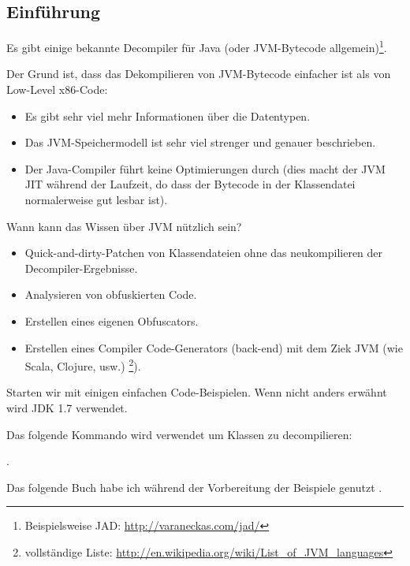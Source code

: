 \subsection{Einführung}

\newcommand{\JADURL}{\url{http://varaneckas.com/jad/}}

Es gibt einige bekannte Decompiler für Java (oder \ac{JVM}-Bytecode
allgemein)\footnote{Beispielsweise JAD: \JADURL}.

Der Grund ist, dass das Dekompilieren von \ac{JVM}-Bytecode einfacher ist als
von Low-Level x86-Code:

\begin{itemize}
\item Es gibt sehr viel mehr Informationen über die Datentypen.
\item Das \ac{JVM}-Speichermodell ist sehr viel strenger und genauer beschrieben.
\item Der Java-Compiler führt keine Optimierungen durch (dies macht der \ac{JVM}
\ac{JIT} während der Laufzeit, do dass der Bytecode in der Klassendatei normalerweise
gut lesbar ist).
\end{itemize}

Wann kann das Wissen über \ac{JVM} nützlich sein?

\newcommand{\URLListOfJVMLangs}{\url{http://en.wikipedia.org/wiki/List_of_JVM_languages}}

\begin{itemize}
\item Quick-and-dirty-Patchen von Klassendateien ohne das neukompilieren der Decompiler-Ergebnisse.
\item Analysieren von obfuskierten Code.
\item Erstellen eines eigenen Obfuscators.
\item Erstellen eines Compiler Code-Generators (back-end) mit dem Ziek \ac{JVM}
(wie Scala, Clojure, usw.) \footnote{vollständige Liste: \URLListOfJVMLangs}).
\end{itemize}

Starten wir mit einigen einfachen Code-Beispielen.
Wenn nicht anders erwähnt wird JDK 1.7 verwendet.

Das folgende Kommando wird verwendet um Klassen zu decompilieren:


.

Das folgende Buch habe ich während der Vorbereitung der Beispiele genutzt
\JavaBook.
